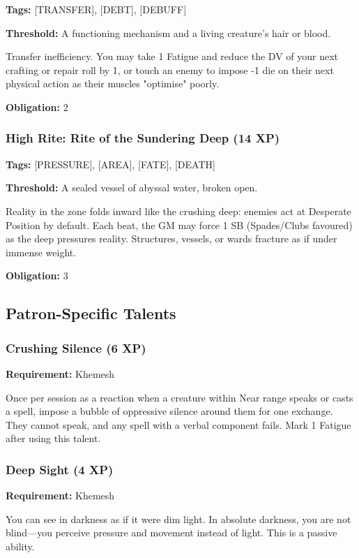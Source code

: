 \textbf{Tags:} [TRANSFER], [DEBT], [DEBUFF]

\textbf{Threshold:} A functioning mechanism and a living creature's hair or blood.

Transfer inefficiency. You may take 1 Fatigue and reduce the DV of your next crafting or repair roll by 1, or touch an enemy to impose -1 die on their next physical action as their muscles "optimise" poorly.

\textbf{Obligation:} 2

\subsubsection{High Rite: Rite of the Sundering Deep (14 XP)}

\textbf{Tags:} [PRESSURE], [AREA], [FATE], [DEATH]

\textbf{Threshold:} A sealed vessel of abyssal water, broken open.

Reality in the zone folds inward like the crushing deep: enemies act at Desperate Position by default. Each beat, the GM may force 1 SB (Spades/Clubs favoured) as the deep pressures reality. Structures, vessels, or wards fracture as if under immense weight.

\textbf{Obligation:} 3

\subsection{Patron-Specific Talents}

\subsubsection{Crushing Silence (6 XP)}

\textbf{Requirement:} Khemesh

Once per session as a reaction when a creature within Near range speaks or casts a spell, impose a bubble of oppressive silence around them for one exchange. They cannot speak, and any spell with a verbal component fails. Mark 1 Fatigue after using this talent.

\subsubsection{Deep Sight (4 XP)}

\textbf{Requirement:} Khemesh

You can see in darkness as if it were dim light. In absolute darkness, you are not blind—you perceive pressure and movement instead of light. This is a passive ability.

